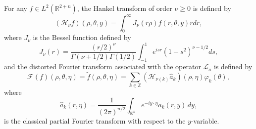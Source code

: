 \documentclass[a4paper,11pt, reqno]{amsart}
\numberwithin{equation}{section}
\theoremstyle{plain}
\theoremstyle{definition}
\theoremstyle{remark}
\begin{document}
For any $f\in L^2(\mathbb{R}^{2+n})$, the Hankel transform of order $\nu\geq0$ is defined by
\begin{equation}\label{6.5}
	(\mathcal{H}_\nu f)(\rho, \theta, y) = \int_0^\infty J_\nu(r\rho) f(r,\theta,y) r dr, 
\end{equation}
where $J_\nu$ is the Bessel function defined by
\begin{equation*}
	 J_\nu(r) = \frac{(r/2)^\nu}{\Gamma(\nu + 1/2)\Gamma(1/2)} \int_{-1}^1 e^{isr} (1 - s^2)^{\nu - 1/2} ds,
\end{equation*}
and the distorted Fourier transform associated with the operator $\mathcal{L}_a$ is defined by
\begin{equation}\label{Distorted}
	\mathcal{F}(f)(\rho, \theta, \eta) = \tilde{f}(\rho, \theta, \eta) = \sum_{k \in \mathbb{Z}} \left( \mathcal{H}_{\nu(k)} \hat{a}_k \right)(\rho, \eta) \varphi_k(\theta),
\end{equation}
where 
\begin{equation*}
\hat{a}_k(r,\eta) =\frac{1}{(2\pi)^{n/2}} \int_{\mathbb{R}^n} e^{-iy \cdot \eta} a_k(r,y) \, dy,
\end{equation*}
is the classical partial Fourier transform with respect to the $y$-variable. 
\end{document}
